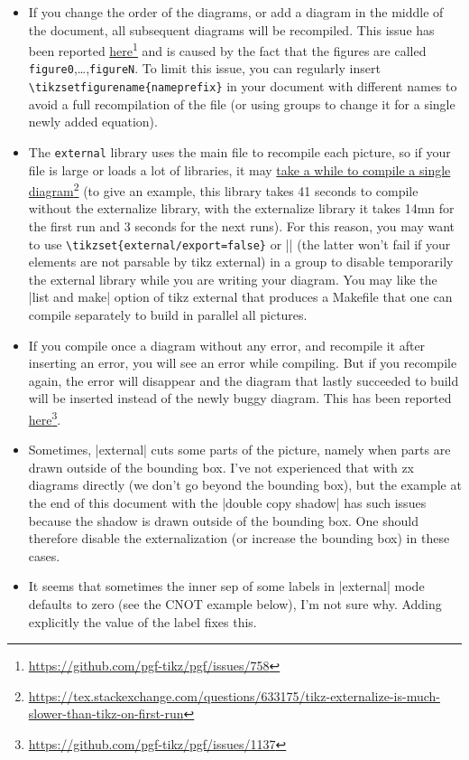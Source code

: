 \documentclass[a4paper,doc2]{ltxdoc} %
\newcommand{\mylink}[2]{\href{#1}{#2}\footnote{\url{#1}}}
\begin{document}
{
\begin{itemize}
\item If you change the order of the diagrams, or add a diagram in the middle of the document, all subsequent diagrams will be recompiled. This issue has been reported \mylink{https://github.com/pgf-tikz/pgf/issues/758}{here} and is caused by the fact that the figures are called \texttt{figure0},\dots,\texttt{figureN}. To limit this issue, you can regularly insert \texttt{\textbackslash{}tikzsetfigurename\{nameprefix\}} in your document with different names to avoid a full recompilation of the file (or using groups to change it for a single newly added equation).
\item The \texttt{external} library uses the main file to recompile each picture, so if your file is large or loads a lot of libraries, it may \mylink{https://tex.stackexchange.com/questions/633175/tikz-externalize-is-much-slower-than-tikz-on-first-run}{take a while to compile a single diagram} (to give an example, this library takes 41 seconds to compile without the externalize library, with the externalize library it takes 14mn for the first run and 3 seconds for the next runs). For this reason, you may want to use \texttt{\textbackslash{}tikzset\{external/export=false\}} or |\tikzexternaldisable| (the latter won't fail if your elements are not parsable by tikz external) in a group to disable temporarily the external library while you are writing your diagram. You may like the |list and make| option of tikz external that produces a Makefile that one can compile separately to build in parallel all pictures.
\item If you compile once a diagram without any error, and recompile it after inserting an error, you will see an error while compiling. But if you recompile again, the error will disappear and the diagram that lastly succeeded to build will be inserted instead of the newly buggy diagram. This has been reported \mylink{https://github.com/pgf-tikz/pgf/issues/1137}{here}.
\item Sometimes, |external| cuts some parts of the picture, namely when parts are drawn outside of the bounding box. I've not experienced that with zx diagrams directly (we don't go beyond the bounding box), but the example at the end of this document with the |double copy shadow| has such issues because the shadow is drawn outside of the bounding box. One should therefore disable the externalization (or increase the bounding box) in these cases.
\item It seems that sometimes the inner sep of some labels in |external| mode defaults to zero (see the CNOT example below), I'm not sure why. Adding explicitly the value of the label fixes this.
\end{itemize}

}
\end{document}
